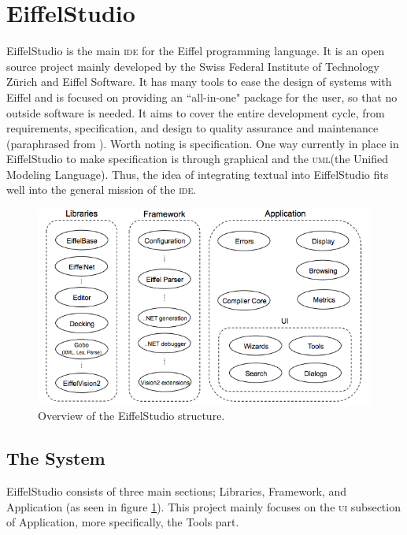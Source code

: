 \section{EiffelStudio}
EiffelStudio is the main \textsc{ide} for the Eiffel programming language. It is an open source project mainly developed by the Swiss Federal Institute of Technology Z\"urich and Eiffel Software. It has many tools to ease the design of systems with Eiffel and is focused on providing an ``all-in-one" package for the user, so that no outside software is needed. It aims to cover the entire development cycle, from requirements, specification, and design to quality assurance and maintenance (paraphrased from \cite{mission}). Worth noting is specification. One way currently in place in EiffelStudio to make specification is through graphical \bon{} and the \textsc{uml}(the Unified Modeling Language). Thus, the idea of integrating textual \bon{} into EiffelStudio fits well into the general mission of the \textsc{ide}.

\begin{figure}[h]
\centerline{
\includegraphics[scale=0.7]{images/eiffelstudio-structure-full.png}
}
\caption[Overview of the EiffelStudio structure]{Overview of the EiffelStudio structure.}
\label{fig:eiffelstudio_structure}
\end{figure}


\subsection{The System}
EiffelStudio consists of three main sections; Libraries, Framework, and Application (as seen in figure \ref{fig:eiffelstudio_structure}). This project mainly focuses on the \textsc{ui} subsection of Application, more specifically, the Tools part.

